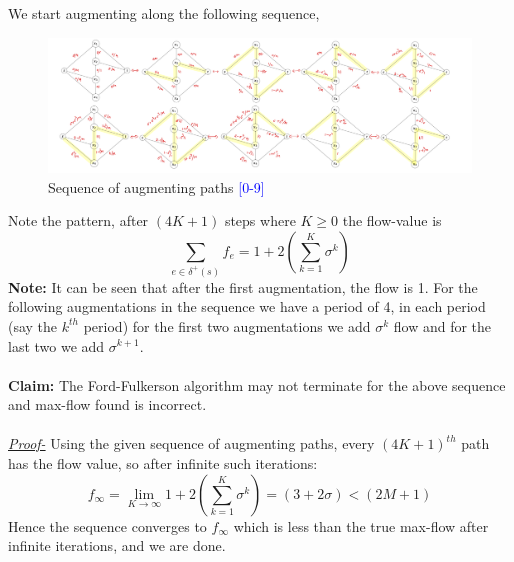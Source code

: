 \documentclass{article}
\begin{document}
    We start augmenting along the following sequence, 
    \begin{figure}[H]
        \centering
        \includegraphics[width = \linewidth]{resources/Q3.jpg}
        \caption{Sequence of augmenting paths \textcolor{blue}{[0-9]}}
        \label{fig:enter-label}
    \end{figure}
    \noindent Note the pattern, after $(4K+1)$ steps where $K\ge 0$ the flow-value is 
    \begin{equation*}
        \sum_{e\in \delta^+(s)} f_e = 1 + 2 \left(\sum_{k=1}^{K}\sigma^k\right)
    \end{equation*}
    \textbf{Note:} It can be seen that after the first augmentation, the flow is 1. For the following augmentations in the sequence we have a period of 4, in each period (say the $k^{th}$ period) for the first two augmentations we add $\sigma^k$ flow and for the last two we add $\sigma^{k+1}$. \\\\
    \textbf{Claim:} The Ford-Fulkerson algorithm may not terminate for the above sequence and max-flow found is incorrect.\\\\
    \textit{\underline{Proof-}} Using the given sequence of augmenting paths, every $(4K+1)^{th}$ path has the flow value, so after infinite such iterations: 
    \begin{equation*}
        f_\infty = \lim_{K\rightarrow \infty} 1 + 2 \left(\sum_{k=1}^{K}\sigma^k\right) = (3 + 2\sigma) < (2M+1)
    \end{equation*}
    Hence the sequence converges to $f_\infty$ which is less than the true max-flow after infinite iterations, and we are done. 
\end{document}
